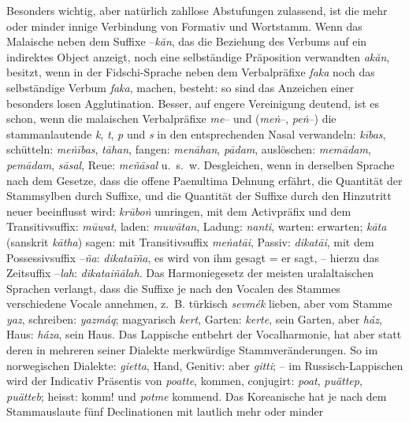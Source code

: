 \label{IV.III.II.4.8c} Besonders wichtig, aber natürlich zahllose Abstufungen zulassend, ist die mehr oder minder innige Verbindung von Formativ und Wortstamm. Wenn das Malaische neben dem Suffixe –\textit{kăn}, das die Beziehung des Verbums auf ein indirektes Object anzeigt, noch eine selbständige Präposition verwandten  \textit{akăn}, besitzt, wenn in der Fidschi-Sprache neben dem Verbalpräfixe \textit{faka} noch das selbständige Verbum \textit{faka}, machen, besteht: so sind das Anzeichen einer besonders losen Agglutination. Besser, auf engere Vereinigung deutend, ist es schon, wenn die malaischen Verbalpräfixe \textit{me}– und  (\textit{meṅ}–, \textit{peṅ}–) die stamman\-\label{fp.333}lautende  \textit{k}, \textit{t}, \textit{p} und \textit{s} in den entsprechenden Nasal verwandeln: \textit{kības}, schütteln: \textit{meṅības}, \textit{tāhan}, fangen: \textit{menāhan}, \textit{pādam}, auslöschen: \textit{memādam}, \textit{pemādam}, \textit{sāsal}, Reue: \textit{meñāsal} u.~s.~w. Desgleichen, wenn in derselben Sprache nach dem Gesetze, dass die offene Paenultima Dehnung erfährt, die Quantität der Stammsylben durch  Suffixe, und die Quantität der Suffixe durch den Hinzutritt neuer beeinflusst wird: \textit{krūboṅ} umringen, mit dem Activpräfix und dem Transitivsuffix:  \textit{mūwat}, laden: \textit{muwātan}, Ladung: \textit{nanti}, warten:  erwarten; \textit{kāta} (sanskrit \textit{kātha}) sagen: mit Transitivsuffix \textit{meṅatāi}, Passiv: \textit{dikatāi}, mit dem Possessivsuffix –\textit{ña}: \textit{dikataīña}, es wird von ihm gesagt = er sagt, – hierzu das Zeitsuffix –\textit{lah}: \textit{dikataiñālah}.  Das Harmoniegesetz der meisten uralaltaischen Sprachen verlangt, dass die Suffixe je nach den Vocalen des Stammes verschiedene Vocale annehmen, z.~B. türkisch \textit{sevmék} lieben, aber vom Stamme \textit{yaz}, schreiben: \textit{yazmáq}; magyarisch \textit{kert}, Garten: \textit{kerte}, sein Garten, aber \textit{ház}, Haus: \textit{háza}, sein Haus. Das Lappische entbehrt der Vocalharmonie, hat aber statt deren in mehreren seiner Dialekte merkwürdige Stammveränderungen. So im norwegischen Dialekte: \textit{gietta}, Hand, Genitiv:  aber  \textit{gitti}; – im Russisch-Lappischen wird der Indicativ Präsentis von \textit{poatte}, kommen, conjugirt:  \textit{poat}, \textit{puättep},  \textit{puätteb};  heisst: komm! und \textit{potme} kommend. Das Koreanische hat je nach dem Stammauslaute fünf Declinationen mit lautlich mehr oder minder \label{sp.351} 